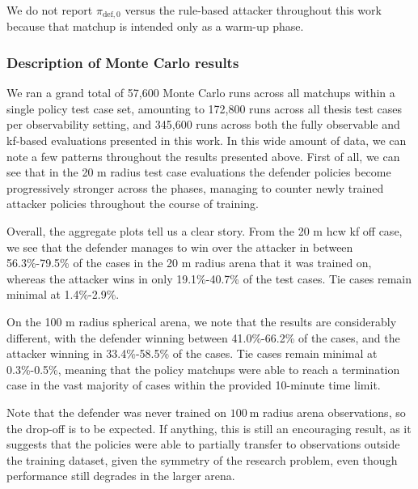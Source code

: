 We do not report {\boldmath\textbf{$\pi_{\mathrm{def},0}$}} versus the rule-based attacker throughout this work because that matchup is intended only as a warm-up phase.




\subsubsection{Description of Monte Carlo results}
\label{sec:mc_results_description}



We ran a grand total of 57,600 Monte Carlo runs across all matchups within a single policy test case set, amounting to 172,800 runs across all thesis test cases per observability setting, and 345,600 runs across both the fully observable and \acs{kf}-based evaluations presented in this work. In this wide amount of data, we can note a few patterns throughout the results presented above. First of all, we can see that in the 20 m radius test case evaluations the defender policies become progressively stronger across the phases, managing to counter newly trained attacker policies throughout the course of training.

Overall, the aggregate plots tell us a clear story. From the 20 m \acs{hcw} \acs{kf} off case, we see that the defender manages to win over the attacker in between 56.3\%-79.5\% of the cases in the 20 m radius arena that it was trained on, whereas the attacker wins in only 19.1\%-40.7\% of the test cases. Tie cases remain minimal at 1.4\%-2.9\%.

On the 100 m radius spherical arena, we note that the results are considerably different, with the defender winning between 41.0\%-66.2\% of the cases, and the attacker winning in 33.4\%-58.5\% of the cases. Tie cases remain minimal at 0.3\%-0.5\%, meaning that the policy matchups were able to reach a termination case in the vast majority of cases within the provided 10-minute time limit.


Note that the defender was never trained on $100~\mathrm{m}$ radius arena observations, so the drop-off is to be expected. If anything, this is still an encouraging result, as it suggests that the policies were able to partially transfer to observations outside the training dataset, given the symmetry of the research problem, even though performance still degrades in the larger arena.

